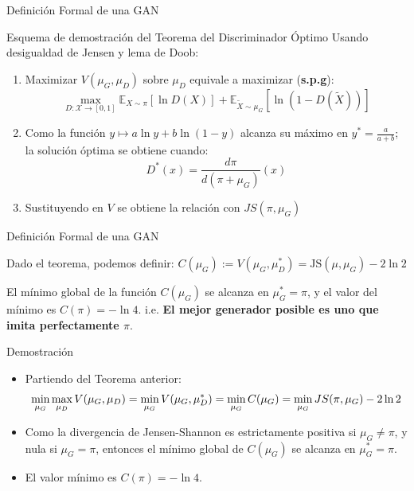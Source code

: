 \documentclass[aspectratio=169,xcolor=dvipsnames, t, spanish]{beamer}
\begin{document}
\begin{frame}{Definición Formal de una GAN}\vspace{-2mm}
\begin{block}{Esquema de demostración del Teorema del Discriminador Óptimo}
Usando desigualdad de Jensen y lema de Doob:
\begin{enumerate}
\item Maximizar $V(\mu_G, \mu_D)$ sobre $\mu_D$ equivale a maximizar (\textbf{s.p.g}): \vspace{-1mm}
\[
\max_{D: \mathcal{X}\to[0,1]} \mathbb{E}_{X\sim \pi}[\ln D(X)] + \mathbb{E}_{\tilde{X}\sim \mu_G}[\ln(1-D(\tilde{X}))]
\]
\item Como la función $y\mapsto a\ln y+b\ln(1-y)$ alcanza su máximo en $y^{*}=\frac{a}{a+b}$; la solución óptima se obtiene cuando: \vspace{-2mm}
        $$D^{*}(x)=\frac{d\pi}{d(\pi+\mu_{G})} (x)$$

\item Sustituyendo en $V$ se obtiene la relación con $JS(\pi, \mu_G)$
\end{enumerate}
\end{block}
\end{frame}


\begin{frame}{Definición Formal de una GAN}\vspace{-7mm}
\begin{center}
    Dado el teorema, podemos definir: $C(\mu_G) := V(\mu_G, \mu_{D}^*) = \text{JS}(\mu, \mu_G) - 2 \ln 2$
\end{center}
\pause
\begin{theorem}
El mínimo global de la función $C(\mu_{G})$ se alcanza en $\mu_{G}^{*}=\pi$, y el valor del mínimo es $C(\pi)=-\ln4$. i.e. \textbf{El mejor generador posible es uno que imita perfectamente $\pi$}.
\end{theorem}
\pause
\begin{block}{Demostración}
    \begin{itemize}
        \item Partiendo del Teorema anterior: \vspace{-2mm}
        $$\min_{\mu_{G}}\max_{\mu_{D}}V(\mu_{G},\mu_{D}) = \min_{\mu_{G}}V(\mu_{G},\mu_{D}^{*}) = \min_{\mu_{G}}C(\mu_{G})= \min_{\mu_{G}}JS(\pi,\mu_{G})-2\ln2 \vspace{-2mm}$$ 
        \item Como la divergencia de Jensen-Shannon es estrictamente positiva si $\mu_{G}\ne\pi$, y nula si $\mu_{G}=\pi$, entonces el mínimo global de $C(\mu_{G})$ se alcanza en $\mu_{G}^{*}=\pi$. 
        \item El valor mínimo es $C(\pi)=-\ln4$. 
    \end{itemize}
\end{block}
\end{frame}
\end{document}
